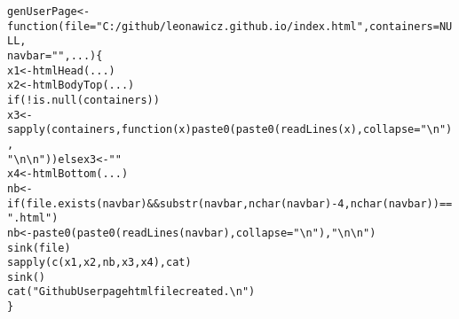 \documentclass{article}\usepackage[]{graphicx}\usepackage[]{color}
\makeatletter
\newcommand{\hlnum}[1]{\textcolor[rgb]{0.863,0.196,0.184}{#1}}%
\newcommand{\hlstr}[1]{\textcolor[rgb]{0.863,0.196,0.184}{#1}}%
\newcommand{\hlopt}[1]{\textcolor[rgb]{0.576,0.631,0.631}{#1}}%
\newcommand{\hlstd}[1]{\textcolor[rgb]{0.514,0.58,0.588}{#1}}%
\newcommand{\hlkwa}[1]{\textcolor[rgb]{0.796,0.294,0.086}{#1}}%
\newcommand{\hlkwb}[1]{\textcolor[rgb]{0.522,0.6,0}{#1}}%
\newcommand{\hlkwc}[1]{\textcolor[rgb]{0.796,0.294,0.086}{#1}}%
\newcommand{\hlkwd}[1]{\textcolor[rgb]{0.576,0.631,0.631}{#1}}%
\newenvironment{kframe}{%
 \def\at@end@of@kframe{}%
 \ifinner\ifhmode%
  \def\at@end@of@kframe{\end{minipage}}%
  \begin{minipage}{\columnwidth}%
 \fi\fi%
 \def\FrameCommand##1{\hskip\@totalleftmargin \hskip-\fboxsep
 \colorbox{shadecolor}{##1}\hskip-\fboxsep
     \hskip-\linewidth \hskip-\@totalleftmargin \hskip\columnwidth}%
 \MakeFramed {\advance\hsize-\width
   \@totalleftmargin\z@ \linewidth\hsize
   \@setminipage}}%
 {\par\unskip\endMakeFramed%
 \at@end@of@kframe}
\newenvironment{knitrout}{}{} %
\makeatother
\begin{document}
\begin{knitrout}
\color{fgcolor}\begin{kframe}
\begin{alltt}
\hlstd{genUserPage} \hlkwb{<-} \hlkwa{function}\hlstd{(}\hlkwc{file} \hlstd{=} \hlstr{"C:/github/leonawicz.github.io/index.html"}\hlstd{,} \hlkwc{containers} \hlstd{=} \hlkwa{NULL}\hlstd{,}
    \hlkwc{navbar} \hlstd{=} \hlstr{""}\hlstd{,} \hlkwc{...}\hlstd{) \{}
    \hlstd{x1} \hlkwb{<-} \hlkwd{htmlHead}\hlstd{(...)}
    \hlstd{x2} \hlkwb{<-} \hlkwd{htmlBodyTop}\hlstd{(...)}
    \hlkwa{if} \hlstd{(}\hlopt{!}\hlkwd{is.null}\hlstd{(containers))}
        \hlstd{x3} \hlkwb{<-} \hlkwd{sapply}\hlstd{(containers,} \hlkwa{function}\hlstd{(}\hlkwc{x}\hlstd{)} \hlkwd{paste0}\hlstd{(}\hlkwd{paste0}\hlstd{(}\hlkwd{readLines}\hlstd{(x),} \hlkwc{collapse} \hlstd{=} \hlstr{"\textbackslash{}n"}\hlstd{),}
            \hlstr{"\textbackslash{}n\textbackslash{}n"}\hlstd{))} \hlkwa{else} \hlstd{x3} \hlkwb{<-} \hlstr{""}
    \hlstd{x4} \hlkwb{<-} \hlkwd{htmlBottom}\hlstd{(...)}
    \hlstd{nb} \hlkwb{<-} \hlkwa{if} \hlstd{(}\hlkwd{file.exists}\hlstd{(navbar)} \hlopt{&&} \hlkwd{substr}\hlstd{(navbar,} \hlkwd{nchar}\hlstd{(navbar)} \hlopt{-} \hlnum{4}\hlstd{,} \hlkwd{nchar}\hlstd{(navbar))} \hlopt{==}
        \hlstr{".html"}\hlstd{)}
        \hlstd{nb} \hlkwb{<-} \hlkwd{paste0}\hlstd{(}\hlkwd{paste0}\hlstd{(}\hlkwd{readLines}\hlstd{(navbar),} \hlkwc{collapse} \hlstd{=} \hlstr{"\textbackslash{}n"}\hlstd{),} \hlstr{"\textbackslash{}n\textbackslash{}n"}\hlstd{)}
    \hlkwd{sink}\hlstd{(file)}
    \hlkwd{sapply}\hlstd{(}\hlkwd{c}\hlstd{(x1, x2, nb, x3, x4), cat)}
    \hlkwd{sink}\hlstd{()}
    \hlkwd{cat}\hlstd{(}\hlstr{"Github User page html file created.\textbackslash{}n"}\hlstd{)}
\hlstd{\}}
\end{alltt}
\end{kframe}
\end{knitrout}
\end{document}
